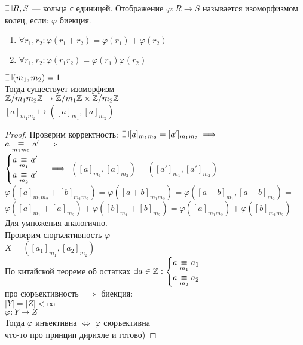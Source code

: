 \begin{normalsize}
\begin{defn}
    $\letus R, S$ --- кольца с единицей. Отображение $\varphi: R \to S$ называется изоморфизмом колец, если: $\varphi$ биекция.\\
    \begin{enumerate}
        \item $\forall r_1, r_2: \varphi(r_1 + r_2) = \varphi(r_1) + \varphi(r_2)$
        \item $\forall r_1, r_2: \varphi(r_1 r_2) = \varphi(r_1) \varphi(r_2)$
    \end{enumerate}
\end{defn}

\begin{theorem-non}
    $\letus (m_1, m_2) = 1$ \\
    Тогда существует изоморфизм \\
    $\mathbb{Z}/m_1m_2\mathbb{Z} \to \mathbb{Z}/m_1\mathbb{Z} \times \mathbb{Z}/m_2\mathbb{Z}$\\
    $[a]_{m_1m_2} \mapsto ([a]_{m_1}, [a]_{m_2})$
\end{theorem-non}

\begin{proof}
    Проверим корректность:
    $\letus [a]_{m_1m_2} = [a']_{m_1m_2} \implies$\\
    $a \underset{m_1m_2}{\equiv} a' \implies$\\
    $\begin{cases}
        a \underset{m_1}{\equiv} a' \\
        a \underset{m_2}{\equiv} a'
    \end{cases} \implies$
    $([a]_{m_1}, [a]_{m_2}) = ([a']_{m_1}, [a']_{m_2})$\\
    $\varphi([a]_{m_1m_2} + [b]_{m_1m_2}) = \varphi([a + b]_{m_1m_2}) = \varphi([a+b]_{m_1}, [a+b]_{m_2}) = $\\
    $\varphi([a]_{m_1} + [a]_{m_2}) + \varphi([b]_{m_1} + [b]_{m_2}) = \varphi([a]_{m_1m_2}) + \varphi([b]_{m_1m_2})$\\
    Для умножения аналогично.\\
    Проверим сюръективность $\varphi$\\
    $X = ([a_1]_{m_1}, [a_2]_{m_2})$\\
    По китайской теореме об остатках $\exists a \in \mathbb{Z}: 
    \begin{cases}
        a \underset{m_1}{\equiv} a_1 \\
        a \underset{m_2}{\equiv} a_2
    \end{cases}$\\

    про сюръективность $\implies$ биекция:\\
    $|Y| = |Z| < \infty$\\
    $\varphi: Y \to Z$\\
    Тогда $\varphi$ инъективна $\iff$ $\varphi$ сюръективна\\
    что-то про принцип дирихле и готово)
\end{proof}

\end{normalsize}


